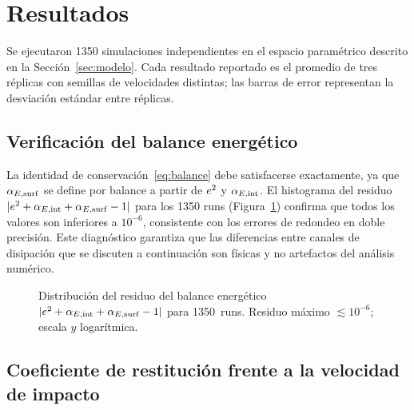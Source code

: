 \section{Resultados}
\label{sec:resultados}

Se ejecutaron \num{1350} simulaciones independientes en el espacio paramétrico
descrito en la Sección~\ref{sec:modelo}. Cada resultado reportado es el
promedio de tres réplicas con semillas de velocidades distintas; las barras
de error representan la desviación estándar entre réplicas.

\subsection{Verificación del balance energético}
\label{sec:balance}

La identidad de conservación~\eqref{eq:balance} debe satisfacerse exactamente,
ya que $\alpha_{E,\mathrm{surf}}$ se define por balance a partir de $e^2$ y $\alpha_{E,\mathrm{int}}$.
El histograma del residuo $|e^2 + \alpha_{E,\mathrm{int}} + \alpha_{E,\mathrm{surf}} - 1|$ para los
\num{1350} runs (Figura~\ref{fig:balance}) confirma que todos los valores son
inferiores a $10^{-6}$, consistente con los errores de redondeo en doble
precisión. Este diagnóstico garantiza que las diferencias entre canales de
disipación que se discuten a continuación son físicas y no artefactos del
análisis numérico.

\begin{figure}[ht]
    \centering
    \caption{Distribución del residuo del balance energético
    $|e^2 + \alpha_{E,\mathrm{int}} + \alpha_{E,\mathrm{surf}} - 1|$ para \num{1350}~runs.
    Residuo máximo $\lesssim 10^{-6}$; escala $y$ logarítmica.}
    \label{fig:balance}
\end{figure}

\subsection{Coeficiente de restitución frente a la velocidad de impacto}
\label{sec:cor_v0}

